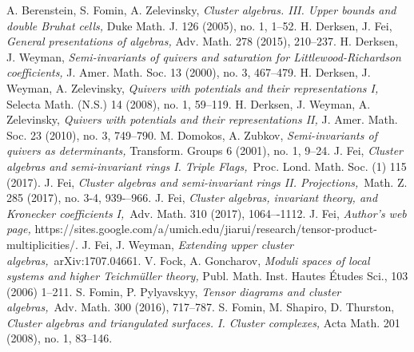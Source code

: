 \documentclass{amsart}
\theoremstyle{definition}
\theoremstyle{remark}
\numberwithin{equation}{section}
\begin{document}

\begin{thebibliography}{99}
 A. Berenstein, S. Fomin, A. Zelevinsky, \textit{Cluster algebras. III. Upper bounds and double Bruhat cells,} Duke Math. J. 126 (2005), no. 1, 1--52.
 H. Derksen, J. Fei, \textit{General presentations of algebras,}  Adv. Math. 278 (2015), 210--237.
 H. Derksen, J. Weyman, \textit{Semi-invariants of quivers and saturation for Littlewood-Richardson coefficients,} J. Amer. Math. Soc. 13 (2000), no. 3, 467--479.
 H. Derksen, J. Weyman, A. Zelevinsky, \textit{Quivers with potentials and their representations I,} Selecta Math. (N.S.) 14 (2008), no. 1, 59--119.
 H. Derksen, J. Weyman, A. Zelevinsky, \textit{Quivers with potentials and their representations II,} J. Amer. Math. Soc. 23 (2010), no. 3, 749--790.
 M. Domokos, A. Zubkov, \textit{Semi-invariants of quivers as determinants,} Transform. Groups 6 (2001), no. 1, 9--24.
 J. Fei, \textit{Cluster algebras and semi-invariant rings I. Triple Flags,}~Proc. Lond. Math. Soc. (1) 115 (2017).
 J. Fei, \textit{Cluster algebras and semi-invariant rings II. Projections,}~Math. Z. 285 (2017), no. 3-4, 939-–966.
 J. Fei, \textit{Cluster algebras, invariant theory, and Kronecker coefficients I,}~Adv. Math. 310 (2017), 1064–-1112.
 J. Fei, \textit{Author's web page,} https://sites.google.com/a/umich.edu/jiarui/research/tensor-product-multiplicities/.
 J. Fei, J. Weyman, \textit{Extending upper cluster algebras,}~arXiv:1707.04661.
 V. Fock, A. Goncharov, \textit{Moduli spaces of local systems and higher Teichm\"{u}ller theory,} Publ. Math. Inst. Hautes \'{E}tudes Sci., 103 (2006) 1--211.
 S. Fomin, P. Pylyavskyy, \textit{Tensor diagrams and cluster algebras,}~Adv. Math. 300 (2016), 717--787.
 S. Fomin, M. Shapiro, D. Thurston, \textit{Cluster algebras and triangulated surfaces. I. Cluster complexes,} Acta Math. 201 (2008), no. 1, 83--146.

\end{thebibliography}
\end{document}
